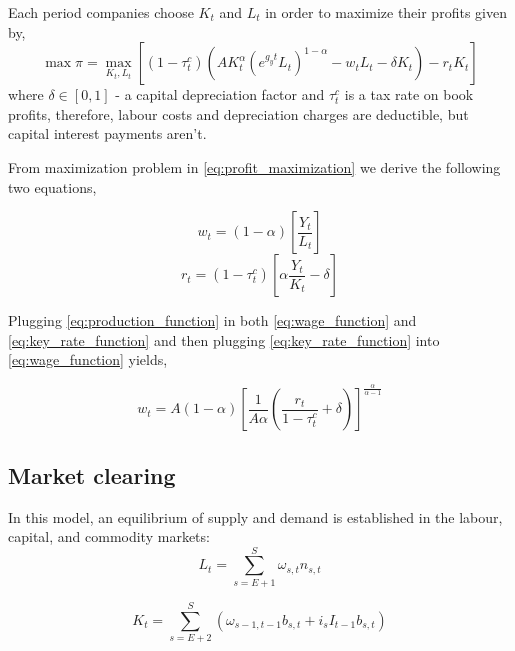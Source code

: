 Each period companies choose $K_t$ and $L_t$ in order to maximize their profits given by,
\begin{equation}\label{eq:profit_maximization}
    \max \pi = \max_{K_t, L_t} \left[ (1-\tau^c_t)\left( AK_t^{\alpha}(e^{g_y t}L_t)^{1-\alpha} -w_tL_t -\delta K_t \right) -r_tK_t \right]
\end{equation}
where $\delta \in [0, 1]$ - a capital depreciation factor and $\tau^c_t$ is a tax rate on book profits, therefore, labour costs and depreciation charges are deductible, but capital interest payments aren't.

From maximization problem in \textcolor{Fuchsia}{\eqref{eq:profit_maximization}} we derive the following two equations,

\begin{equation}\label{eq:wage_function}
    w_t=(1-\alpha) \left[ \frac{Y_t}{L_t} \right]
\end{equation}
\begin{equation}\label{eq:key_rate_function}
    r_t=(1-\tau_t^c) \left[ \alpha \frac{Y_t}{K_t} - \delta \right]
\end{equation}

Plugging \textcolor{Fuchsia}{\eqref{eq:production_function}} in both \textcolor{Fuchsia}{\eqref{eq:wage_function}} and \textcolor{Fuchsia}{\eqref{eq:key_rate_function}} and then plugging \textcolor{Fuchsia}{\eqref{eq:key_rate_function}} into \textcolor{Fuchsia}{\eqref{eq:wage_function}} yields,

\begin{equation}\label{eq:combined_wage_function}
    w_t=A(1-\alpha) \left[ \frac{1}{A\alpha} \left( \frac{r_t}{1-\tau^c_t} +\delta \right) \right]^{\frac{\alpha}{\alpha-1}}
\end{equation}



\subsection{Market clearing}
\label{subsec:clearing}

In this model, an equilibrium of supply and demand is established in the labour, capital, and commodity markets:
\begin{equation}\label{eq:aggregate_labour}
    L_t = \sum_{s=E+1}^{S} \omega_{s,t} n_{s,t}
\end{equation}

\begin{equation}\label{eq:aggregate_capital}
    K_t = \sum_{s=E+2}^{S} \left( \omega_{s-1,t-1} b_{s,t} + i_s I_{t-1} b_{s,t} \right)
\end{equation}

